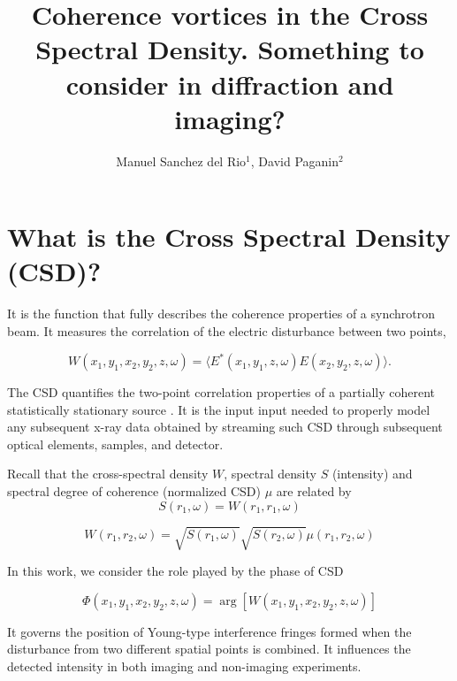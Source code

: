 \documentclass[a4paper,10pt]{article}
\title{Coherence vortices in the Cross Spectral Density. Something to consider in diffraction and imaging?}
\author{Manuel Sanchez del Rio$^1$, David Paganin$^2$}
\begin{document}
\maketitle

\begin{abstract}

\end{abstract}

\section{What is the Cross Spectral Density (CSD)?}

It is the function that fully describes the coherence properties of a synchrotron beam. It measures the correlation of the electric disturbance between two points,

\begin{equation}
W(x_1,y_1,x_2,y_2,z,\omega) = 
\langle E^{*}(x_1,y_1,z,\omega) E(x_2,y_2,z,\omega)\rangle.
\end{equation}

The CSD quantifies the two-point correlation properties of a partially coherent statistically stationary source \cite{mandel_wolf}. 
It is the input input needed to properly model any subsequent x-ray data obtained by streaming such CSD through subsequent optical elements, samples, and detector.

Recall that the cross-spectral density $W$, spectral density $S$ (intensity) and spectral degree of coherence (normalized CSD) $\mu$ are related by 
\begin{equation}
S(r_1,\omega) = W(r_1,r_1,\omega) 
\end{equation}

\begin{equation}
W(r_1,r_2,\omega)=\sqrt{S(r_1,\omega)}\sqrt{S(r_2,\omega)}\mu(r_1,r_2,\omega)
\end{equation}

In this work, we consider the role played by the phase of CSD

\begin{equation}\label{phase_of_W}
\Phi(x_1,y_1,x_2,y_2,z,\omega)=\arg[W(x_1,y_1,x_2,y_2,z,\omega)]
\end{equation}

It governs the position of Young-type interference fringes formed when the disturbance from two different spatial points is combined. It influences the detected intensity in both imaging and non-imaging experiments.
\end{document}
